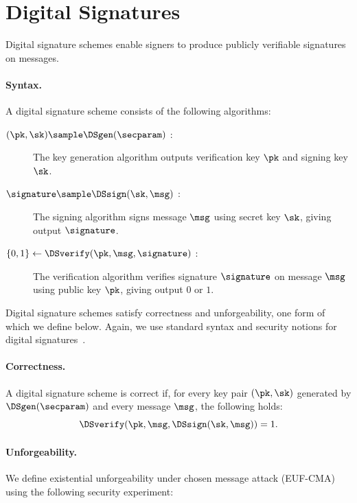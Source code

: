 \section{Digital Signatures}\label{sec:prelims-signatures}

Digital signature schemes enable signers to produce publicly verifiable
signatures on messages.

\paragraph{Syntax.} A digital signature scheme consists of the following
algorithms:

\begin{description}

  \item[$(\pk,\sk) \sample \DSgen(\secparam)$ : ] The key generation algorithm
    outputs verification key $\pk$ and signing key $\sk$.

  \item[$\signature \sample \DSsign(\sk, \msg)$ : ] The signing algorithm signs
    message $\msg$ using secret key $\sk$, giving output $\signature$.

  \item[$\{0,1\} \leftarrow \DSverify(\pk,\msg,\signature)$ : ] The
    verification algorithm verifies signature $\signature$ on message $\msg$
    using public key $\pk$, giving output $0$ or $1$.

\end{description}

Digital signature schemes satisfy correctness and unforgeability, one form of
which we define below. Again, we use standard syntax and security notions for
digital signatures~\cite{KatLin14}.

\paragraph{Correctness.} A digital signature scheme is correct if, for every
key pair $(\pk,\sk)$ generated by $\DSgen(\secparam)$ and every message $\msg$,
the following holds:
%
\begin{equation*}
%
  \DSverify(\pk, \msg, \DSsign(\sk, \msg)) = 1.
%
\end{equation*}
%

\paragraph{Unforgeability.} We define existential unforgeability under chosen
message attack (EUF-CMA) using the following security experiment:

